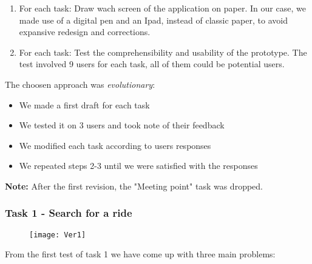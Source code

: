 \documentclass{article}
\begin{document}
\begin{enumerate}
    \item For each task: Draw wach screen of the application on paper. In our case, we made use of a digital pen and an Ipad, instead of classic paper, to avoid expansive redesign and corrections.
    \item For each task: Test the comprehensibility and usability of the prototype. The test involved 9 users for each task, all of them could be potential users.
\end{enumerate}

The choosen approach was \textit{evolutionary}:
\begin{itemize}
    \item We made a first draft for each task
    \item We tested it on 3 users and took note of their feedback
    \item We modified each task according  to users responses
    \item We repeated steps 2-3 until we were satisfied with the responses
\end{itemize}
\textbf{Note:} After the first revision, the "Meeting point" task was dropped.
\newpage
\subsubsection{Task 1 - Search for a ride}
\graphicspath{{Doc images/Paper prototyping/Task 1}}

\begin{figure}
    \centering
     \texttt{[image: Ver1]}
\end{figure}

From the first test of task 1 we have come up with three main problems:
\end{document}
